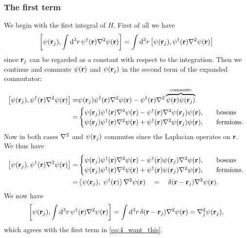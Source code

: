 \documentclass[11pt,letter, swedish, english
]{article}
\begin{document}
\subsubsection{The first term}
We begin with the first integral of $H$. First of all we have
\begin{equation}
\comm{\psi(\vb{r}_j)}{\int\rd^3r\,
\psi^\dagger(\vb{r})\laplacian\psi(\vb{r})}=
\int\rd^3r\,
\comm{\psi(\vb{r}_j)}
{\psi^\dagger(\vb{r})\laplacian\psi(\vb{r})}
\end{equation}
since $\vb{r}_j$ can be regarded as a constant with respect to the
integration. Then we continue and commute $\psi(\vb{r})$ and
$\psi(\vb{r}_j)$ in the second term of the expanded commutator:
\begin{equation}
\begin{aligned}
\comm{\psi(\vb{r}_j)}
{\psi^\dagger(\vb{r})\laplacian\psi(\vb{r})}
=&\psi(\vb{r}_j)\psi^\dagger(\vb{r})\laplacian\psi(\vb{r})
-\psi^\dagger(\vb{r})\laplacian
\commute{\psi(\vb{r})\psi(\vb{r}_j)}\\
=&\begin{cases}
\psi(\vb{r}_j)\psi^\dagger(\vb{r})\laplacian\psi(\vb{r})
-\psi^\dagger(\vb{r})\laplacian\psi(\vb{r}_j)\psi(\vb{r})
\qcomma&\text{bosons}\\
\psi(\vb{r}_j)\psi^\dagger(\vb{r})\laplacian\psi(\vb{r})
+\psi^\dagger(\vb{r})\laplacian\psi(\vb{r}_j)\psi(\vb{r}),
&\text{fermions}.
\end{cases}
\end{aligned}
\end{equation}
Now in both cases $\laplacian$ and $\psi(\vb{r}_j)$ commutes since the
Laplacian operates on $\vb{r}$. We thus have
\begin{equation}
\begin{aligned}
\comm{\psi(\vb{r}_j)}
{\psi^\dagger(\vb{r})\laplacian\psi(\vb{r})}
=&\begin{cases}
\psi(\vb{r}_j)\psi^\dagger(\vb{r})\laplacian\psi(\vb{r})
-\psi^\dagger(\vb{r})\psi(\vb{r}_j)\laplacian\psi(\vb{r})
\qcomma&\text{bosons}\\
\psi(\vb{r}_j)\psi^\dagger(\vb{r})\laplacian\psi(\vb{r})
+\psi^\dagger(\vb{r})\psi(\vb{r}_j)\laplacian\psi(\vb{r}),
&\text{fermions}.
\end{cases}\\
=&\scomm{\psi(\vb{r}_j)}{\psi^\dagger(\vb{r})}
\laplacian\psi(\vb{r})%
\quad=\quad
\delta(\vb{r}-\vb{r}_j)\laplacian\psi(\vb{r}).
\end{aligned}
\end{equation}
We now have
\begin{equation}\label{eq:4_comm_i}
\comm{\psi(\vb{r}_j)}{\int\rd^3r\,
\psi^\dagger(\vb{r})\laplacian\psi(\vb{r})}=
\int\rd^3r\,\delta(\vb{r}-\vb{r}_j)\laplacian\psi(\vb{r})
=\laplacian_j\psi(\vb{r}_j),
\end{equation}
which agrees with the first term in \eqref{eq:4_want_this}.
\end{document}

